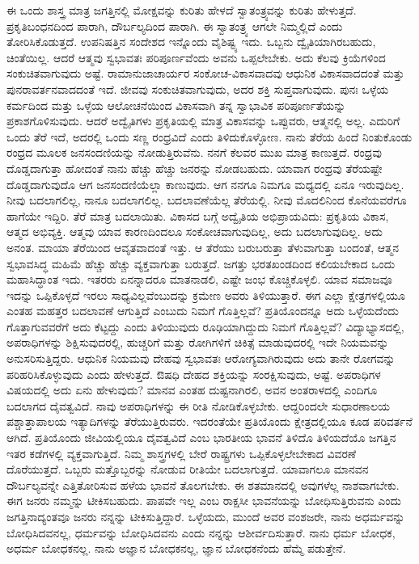 ಈ ಒಂದು ಶಾಸ್ತ್ರ ಮಾತ್ರ ಜಗತ್ತಿನಲ್ಲಿ ಮೋಕ್ಷವನ್ನು ಕುರಿತು ಹೇಳದೆ ಸ್ವಾತಂತ್ರ್ಯವನ್ನು ಕುರಿತು ಹೇಳುತ್ತದೆ. ಪ್ರಕೃತಿಬಂಧನದಿಂದ ಪಾರಾಗಿ, ದೌರ್ಬಲ್ಯದಿಂದ ಪಾರಾಗಿ. ಈ ಸ್ವಾತಂತ್ರ್ಯ ಆಗಲೇ ನಿಮ್ಮಲ್ಲಿದೆ ಎಂದು ತೋರಿಸಿಕೊಡುತ್ತದೆ. ಉಪನಿಷತ್ತಿನ ಸಂದೇಶದ ಇನ್ನೊಂದು ವೈಶಿಷ್ಟ್ಯ ಇದು. ಒಬ್ಬನು ದ್ವೈತಿಯಾಗಿರಬಹುದು, ಚಿಂತೆಯಿಲ್ಲ. ಆದರೆ ಆತ್ಮವು ಸ್ವಭಾವತಃ ಪರಿಪೂರ್ಣವೆಂದು ಅವನು ಒಪ್ಪಲೇಬೇಕು. ಅದು ಕೆಲವು ಕ್ರಿಯೆಗಳಿಂದ ಸಂಕುಚಿತವಾಗುವುದು ಅಷ್ಟೆ. ರಾಮಾನುಜಾಚಾರ್ಯರ ಸಂಕೋಚ-ವಿಕಾಸವಾದವು ಆಧುನಿಕ ವಿಕಾಸವಾದದಂತೆ ಮತ್ತು ಪುನರಾವರ್ತನವಾದದಂತೆ  ಇದೆ. ಜೀವವು ಸಂಕುಚಿತವಾಗುವುದು, ಅದರ ಶಕ್ತಿ ಸುಪ್ತವಾಗುವುದು. ಪುನಃ ಒಳ್ಳೆಯ ಕರ್ಮದಿಂದ ಮತ್ತು ಒಳ್ಳೆಯ ಆಲೋಚನೆಯಿಂದ ವಿಕಾಸವಾಗಿ ತನ್ನ ಸ್ವಾಭಾವಿಕ ಪರಿಪೂರ್ಣತೆಯನ್ನು ಪ್ರಕಾಶಗೊಳಿಸುವುದು. ಆದರೆ ಅದ್ವೈತಿಗಳು ಪ್ರಕೃತಿಯಲ್ಲಿ ಮಾತ್ರ ವಿಕಾಸವನ್ನು ಒಪ್ಪುವರು, ಆತ್ಮನಲ್ಲಿ ಅಲ್ಲ. ಎದುರಿಗೆ ಒಂದು ತೆರೆ ಇದೆ, ಅದರಲ್ಲಿ ಒಂದು ಸಣ್ಣ ರಂಧ್ರವಿದೆ ಎಂದು ತಿಳಿದುಕೊಳ್ಳೋಣ. ನಾನು ತೆರೆಯ ಹಿಂದೆ ನಿಂತುಕೊಂಡು ರಂಧ್ರದ ಮೂಲಕ ಜನಸಂದಣಿಯನ್ನು ನೋಡುತ್ತಿರುವೆನು. ನನಗೆ ಕೆಲವರ ಮುಖ ಮಾತ್ರ ಕಾಣುತ್ತದೆ. ರಂಧ್ರವು ದೊಡ್ಡದಾಗುತ್ತಾ ಹೋದಂತೆ ನಾನು ಹೆಚ್ಚು ಹೆಚ್ಚು ಜನರನ್ನು ನೋಡಬಹುದು. ಯಾವಾಗ ರಂಧ್ರವು ತೆರೆಯಷ್ಟೇ ದೊಡ್ಡದಾಗುವುದೊ ಆಗ ಜನಸಂದಣಿಯೆಲ್ಲಾ ಕಾಣುವುದು. ಆಗ ನನಗೂ ನಿಮಗೂ ಮಧ್ಯದಲ್ಲಿ ಏನೂ ಇರುವುದಿಲ್ಲ. ನೀವು ಬದಲಾಗಲಿಲ್ಲ, ನಾನೂ ಬದ\-ಲಾಗಲಿಲ್ಲ. ಬದಲಾವಣೆಯೆಲ್ಲ ತೆರೆಯಲ್ಲಿ. ನೀವು ಮೊದಲಿನಿಂದ ಕೊನೆಯವರೆಗೂ ಹಾಗೆಯೇ ಇದ್ದಿರಿ. ತೆರೆ ಮಾತ್ರ ಬದಲಾಯಿತು. ವಿಕಾಸದ ಬಗ್ಗೆ ಅದ್ವೈತಿಯ ಅಭಿಪ್ರಾಯವಿದು: ಪ್ರಕೃತಿಯ ವಿಕಾಸ, ಆತ್ಮದ ಅಭಿವ್ಯಕ್ತಿ. ಆತ್ಮವು ಯಾವ ಕಾರಣದಿಂದಲೂ ಸಂಕೋಚವಾಗುವುದಿಲ್ಲ, ಅದು ಬದಲಾಗುವುದಿಲ್ಲ. ಅದು ಅನಂತ. ಮಾಯಾ ತೆರೆಯಿಂದ ಆವೃತವಾದಂತೆ ಇತ್ತು. ಆ ತೆರೆಯು ಬರುಬರುತ್ತಾ ತೆಳುವಾಗುತ್ತಾ ಬಂದಂತೆ, ಆತ್ಮನ ಸ್ವಭಾವಸಿದ್ಧ ಮಹಿಮೆ ಹೆಚ್ಚು ಹೆಚ್ಚು ವ್ಯಕ್ತವಾಗುತ್ತಾ ಬರುತ್ತದೆ. ಜಗತ್ತು ಭರತಖಂಡದಿಂದ ಕಲಿಯಬೇಕಾದ ಒಂದು ಮಹಾಸಿದ್ಧಾಂತ ಇದು. ಇತರರು ಏನನ್ನಾದರೂ ಮಾತನಾಡಲಿ, ಎಷ್ಟೇ ಜಂಭ ಕೊಚ್ಚಿಕೊಳ್ಳಲಿ. ಯಾವ ಸಮಾಜವೂ ಇದನ್ನು ಒಪ್ಪಿಕೊಳ್ಳದೆ ಇರಲು ಸಾಧ್ಯವಿಲ್ಲವೆಂಬುದನ್ನು ಕ್ರಮೇಣ ಅವರು ತಿಳಿಯುತ್ತಾರೆ. ಈಗ ಎಲ್ಲಾ ಕ್ಷೇತ್ರಗಳಲ್ಲಿಯೂ ಎಂತಹ ಮಹತ್ತರ ಬದಲಾವಣೆ ಆಗುತ್ತಿದೆ ಎಂಬುದು ನಿಮಗೆ ಗೊತ್ತಿಲ್ಲವೆ? ಪ್ರತಿಯೊಂದನ್ನೂ ಅದು ಒಳ್ಳೆಯದೆಂದು ಗೊತ್ತಾಗುವವರೆಗೆ ಅದು ಕೆಟ್ಟದ್ದು ಎಂದು ತಿಳಿಯುವುದು ರೂಢಿಯಾಗಿದ್ದುದು ನಿಮಗೆ ಗೊತ್ತಿಲ್ಲವೆ? ವಿದ್ಯಾಭ್ಯಾಸದಲ್ಲಿ, ಅಪರಾಧಿಗಳನ್ನು ಶಿಕ್ಷಿಸುವುದರಲ್ಲಿ, ಹುಚ್ಚರಿಗೆ ಮತ್ತು ರೋಗಿಗಳಿಗೆ ಚಿಕಿತ್ಸೆ ಮಾಡುವುದರಲ್ಲಿ ಇದೇ ನಿಯಮವನ್ನು ಅನುಸರಿಸುತ್ತಿದ್ದರು. ಆಧುನಿಕ ನಿಯಮವು ದೇಹವು ಸ್ವಭಾವತಃ ಆರೋಗ್ಯವಾಗಿರುವುದು ಅದು ತಾನೇ ರೋಗವನ್ನು ಪರಿಹರಿಸಿಕೊಳ್ಳುವುದು ಎಂದು ಹೇಳುತ್ತದೆ. ಔಷಧಿ ದೇಹದ ಶಕ್ತಿಯನ್ನು ಸಂರಕ್ಷಿಸುವುದು, ಅಷ್ಟೆ. ಅಪರಾಧಿಗಳ ವಿಷಯದಲ್ಲಿ ಅದು ಏನು ಹೇಳುವುದು? ಮಾನವ ಎಂತಹ ದುಷ್ಟನಾಗಿರಲಿ, ಅವನ ಅಂತರಾಳದಲ್ಲಿ ಎಂದಿಗೂ ಬದಲಾಗದ ದೈವತ್ವವಿದೆ. ನಾವು ಅಪರಾಧಿಗಳನ್ನು ಈ ರೀತಿ ನೋಡಿಕೊಳ್ಳಬೇಕು. ಆದ್ದರಿಂದಲೇ ಸುಧಾರಣಾಲಯ  ಪಶ್ಚಾತ್ತಾಪಾಲಯ  ಇತ್ಯಾದಿಗಳನ್ನು ತೆರೆಯುತ್ತಿರುವರು. ಇದರಂತೆಯೇ ಪ್ರತಿಯೊಂದು ಕ್ಷೇತ್ರದಲ್ಲಿಯೂ ಕೂಡ ಪರಿವರ್ತನೆ ಆಗಿದೆ. ಪ್ರತಿಯೊಂದು ಜೀವಿಯಲ್ಲಿಯೂ ದೈವತ್ವವಿದೆ ಎಂಬ ಭಾರತೀಯ ಭಾವನೆ ತಿಳಿದೊ ತಿಳಿಯದೆಯೊ ಜಗತ್ತಿನ ಇತರ ಕಡೆಗಳಲ್ಲಿ ವ್ಯಕ್ತವಾಗುತ್ತಿದೆ. ನಿಮ್ಮ ಶಾಸ್ತ್ರಗಳಲ್ಲಿ ಬೇರೆ ರಾಷ್ಟ್ರಗಳು ಒಪ್ಪಿಕೊಳ್ಳಲೇಬೇಕಾದ ವಿವರಣೆ ದೊರೆಯುತ್ತದೆ. ಒಬ್ಬರು ಮತ್ತೊಬ್ಬರನ್ನು ನೋಡುವ ರೀತಿಯೇ ಬದಲಾಗುತ್ತದೆ. ಯಾವಾಗಲೂ ಮಾನವನ ದೌರ್ಬಲ್ಯವನ್ನೇ ಎತ್ತಿತೋರಿಸುವ ಹಳೆಯ ಭಾವನೆ ತೊಲಗಬೇಕು. ಈ ಶತಮಾನದಲ್ಲಿ ಅವುಗಳೆಲ್ಲ ನಾಶವಾಗಬೇಕು. ಈಗ ಜನರು ನಮ್ಮನ್ನು ಟೀಕಿಸಬಹುದು. ಪಾಪವೇ ಇಲ್ಲ ಎಂಬ ರಾಕ್ಷಸೀ ಭಾವನೆಯನ್ನು ಬೋಧಿಸುತ್ತಿರುವನು ಎಂದು ಜಗತ್ತಿನಾದ್ಯಂತವೂ ಜನರು ನನ್ನನ್ನು ಟೀಕಿಸುತ್ತಿದ್ದಾರೆ. ಒಳ್ಳೆಯದು, ಮುಂದೆ ಅವರ ವಂಶಜರೇ, ನಾನು ಅಧರ್ಮವನ್ನು ಬೋಧಿಸಿದವನಲ್ಲ, ಧರ್ಮವನ್ನು ಬೋಧಿಸಿದವನು ಎಂದು ನನ್ನನ್ನು ಆಶೀರ್ವದಿಸುತ್ತಾರೆ. ನಾನು ಧರ್ಮ ಬೋಧಕ, ಅಧರ್ಮ ಬೋಧಕನಲ್ಲ. ನಾನು ಅಜ್ಞಾನ ಬೋಧಕನಲ್ಲ, ಜ್ಞಾನ ಬೋಧಕನೆಂದು ಹೆಮ್ಮೆ ಪಡುತ್ತೇನೆ.

